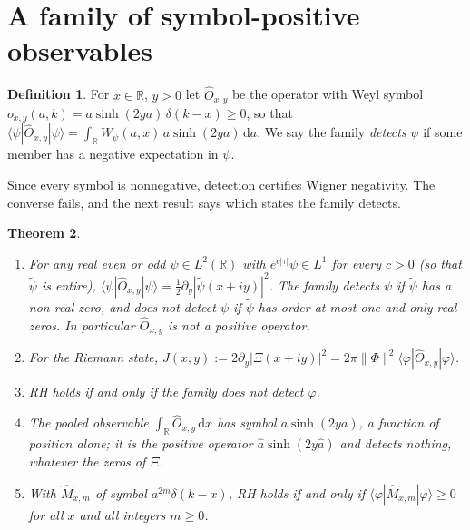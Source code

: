 \documentclass[11pt]{article}
\newtheorem{theorem}{Theorem}[section]
\theoremstyle{definition}\newtheorem{definition}[theorem]{Definition}
\theoremstyle{remark}\newtheorem{remark}[theorem]{Remark}
\newcommand{\R}{\mathbb R}\newcommand{\C}{\mathbb C}\newcommand{\N}{\mathbb N}
\newcommand{\dd}{\,\mathrm d}\newcommand{\e}{\mathrm e}
\begin{document}
\section{A family of symbol-positive observables}\label{sec:obs}
\begin{definition}
For $x\in\R$, $y>0$ let $\hat O_{x,y}$ be the operator with Weyl symbol $o_{x,y}(a,k)=a\sinh(2ya)\,\delta(k-x)\ge0$, so that $\langle\psi|\hat O_{x,y}|\psi\rangle=\int_\R W_\psi(a,x)\,a\sinh(2ya)\dd a$. We say the family \emph{detects} $\psi$ if some member has a negative expectation in $\psi$.
\end{definition}
Since every symbol is nonnegative, detection certifies Wigner negativity. The converse fails, and the next result says which states the family detects.

\begin{theorem}\label{thm:witness}
\begin{enumerate}[label=(\roman*),leftmargin=2em]
\item For any real even or odd $\psi\in L^2(\R)$ with $e^{c|\tau|}\psi\in L^1$ for every $c>0$ (so that $\tilde\psi$ is entire), $\langle\psi|\hat O_{x,y}|\psi\rangle=\frac12\partial_y|\tilde\psi(x+iy)|^2$. The family detects $\psi$ if $\tilde\psi$ has a non-real zero, and does not detect $\psi$ if $\tilde\psi$ has order at most one and only real zeros. In particular $\hat O_{x,y}$ is not a positive operator.
\item For the Riemann state, $J(x,y):=2\partial_y|\Xi(x+iy)|^2=2\pi\|\Phi\|^2\langle\varphi|\hat O_{x,y}|\varphi\rangle$.
\item RH holds if and only if the family does not detect $\varphi$.
\item The pooled observable $\int_\R\hat O_{x,y}\dd x$ has symbol $a\sinh(2ya)$, a function of position alone; it is the positive operator $\hat a\sinh(2y\hat a)$ and detects nothing, whatever the zeros of $\Xi$.
\item With $\hat M_{x,m}$ of symbol $a^{2m}\delta(k-x)$, RH holds if and only if $\langle\varphi|\hat M_{x,m}|\varphi\rangle\ge0$ for all $x$ and all integers $m\ge0$.
\end{enumerate}
\end{theorem}
\end{document}
